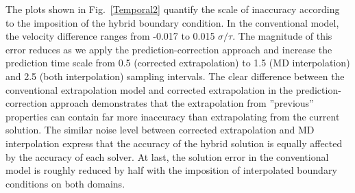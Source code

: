 \documentclass[preprint,12pt]{elsarticle}
\begin{document}

The plots shown in Fig.~\ref{Temporal2} quantify the scale of inaccuracy according to the imposition of the hybrid boundary condition. In the conventional model, the velocity difference ranges from -0.017 to 0.015 $\sigma/\tau$. The magnitude of this error reduces as we apply the prediction-correction approach and increase the prediction time scale from 0.5 (corrected extrapolation) to 1.5 (MD interpolation) and 2.5 (both interpolation) sampling intervals. The clear difference between the conventional extrapolation model and corrected extrapolation in the prediction-correction approach demonstrates that the extrapolation from ''previous'' properties can contain far more inaccuracy than extrapolating from the current solution. The similar noise level between corrected extrapolation and MD interpolation express that the accuracy of the hybrid solution is equally affected by the accuracy of each solver. At last, the solution error in the conventional model is roughly reduced by half with the imposition of interpolated boundary conditions on both domains. 
\end{document}
